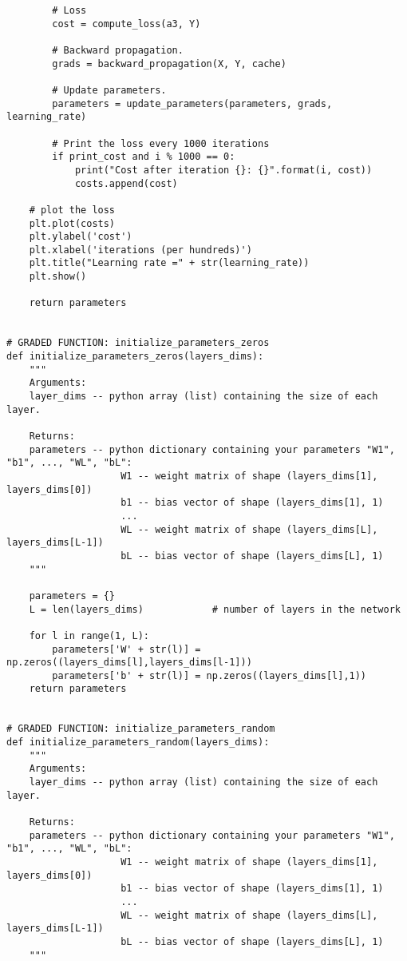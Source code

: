 \begin{verbatim}
        # Loss
        cost = compute_loss(a3, Y)

        # Backward propagation.
        grads = backward_propagation(X, Y, cache)
        
        # Update parameters.
        parameters = update_parameters(parameters, grads, learning_rate)
        
        # Print the loss every 1000 iterations
        if print_cost and i % 1000 == 0:
            print("Cost after iteration {}: {}".format(i, cost))
            costs.append(cost)
            
    # plot the loss
    plt.plot(costs)
    plt.ylabel('cost')
    plt.xlabel('iterations (per hundreds)')
    plt.title("Learning rate =" + str(learning_rate))
    plt.show()
    
    return parameters


# GRADED FUNCTION: initialize_parameters_zeros 
def initialize_parameters_zeros(layers_dims):
    """
    Arguments:
    layer_dims -- python array (list) containing the size of each layer.
    
    Returns:
    parameters -- python dictionary containing your parameters "W1", "b1", ..., "WL", "bL":
                    W1 -- weight matrix of shape (layers_dims[1], layers_dims[0])
                    b1 -- bias vector of shape (layers_dims[1], 1)
                    ...
                    WL -- weight matrix of shape (layers_dims[L], layers_dims[L-1])
                    bL -- bias vector of shape (layers_dims[L], 1)
    """
    
    parameters = {}
    L = len(layers_dims)            # number of layers in the network
    
    for l in range(1, L):
        parameters['W' + str(l)] = np.zeros((layers_dims[l],layers_dims[l-1])) 
        parameters['b' + str(l)] = np.zeros((layers_dims[l],1)) 
    return parameters


# GRADED FUNCTION: initialize_parameters_random
def initialize_parameters_random(layers_dims):
    """
    Arguments:
    layer_dims -- python array (list) containing the size of each layer.
    
    Returns:
    parameters -- python dictionary containing your parameters "W1", "b1", ..., "WL", "bL":
                    W1 -- weight matrix of shape (layers_dims[1], layers_dims[0])
                    b1 -- bias vector of shape (layers_dims[1], 1)
                    ...
                    WL -- weight matrix of shape (layers_dims[L], layers_dims[L-1])
                    bL -- bias vector of shape (layers_dims[L], 1)
    """
    

\end{verbatim}
